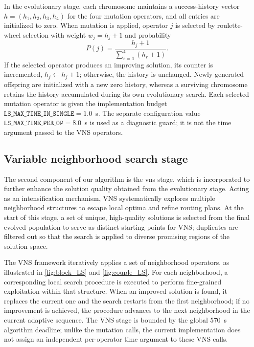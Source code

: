 \documentclass[pdflatex]{sn-jnl}
\begin{document}
In the evolutionary stage, each chromosome maintains a success-history vector $h=(h_1,h_2,h_3,h_4)$ for the four mutation operators, and all entries are initialized to zero. When mutation is applied, operator $j$ is selected by roulette-wheel selection with weight $w_j=h_j+1$ and probability
\begin{equation}
P(j)=\frac{h_j+1}{\sum_{r=1}^{4}(h_r+1)}.
\end{equation}
If the selected operator produces an improving solution, its counter is incremented, $h_j\leftarrow h_j+1$; otherwise, the history is unchanged. Newly generated offspring are initialized with a new zero history, whereas a surviving chromosome retains the history accumulated during its own evolutionary search. Each selected mutation operator is given the implementation budget $\texttt{LS\_MAX\_TIME\_IN\_SINGLE}=1.0$~s. The separate configuration value $\texttt{LS\_MAX\_TIME\_PER\_OP}=8.0$~s is used as a diagnostic guard; it is not the time argument passed to the VNS operators.



\subsection{Variable neighborhood search stage}
The second component of our algorithm is the \gls{vns} stage, which is incorporated to further enhance the solution quality obtained from the evolutionary stage. Acting as an intensification mechanism, VNS systematically explores multiple neighborhood structures to escape local optima and refine routing plans. At the start of this stage, a set of unique, high-quality solutions is selected from the final evolved population to serve as distinct starting points for VNS; duplicates  are filtered out so that the search is applied to diverse promising regions of the solution space.

The VNS framework iteratively applies a set of neighborhood operators, as illustrated in \autoref{fig:block_LS} and \autoref{fig:couple_LS}. For each neighborhood, a corresponding local search procedure is executed to perform fine-grained exploitation within that structure. When an improved solution is found, it replaces the current one and the search restarts from the first neighborhood; if no improvement is achieved, the procedure advances to the next neighborhood in the current adaptive sequence. The VNS stage is bounded by the global 570~s algorithm deadline; unlike the mutation calls, the current implementation does not assign an independent per-operator time argument to these VNS calls.
\end{document}
